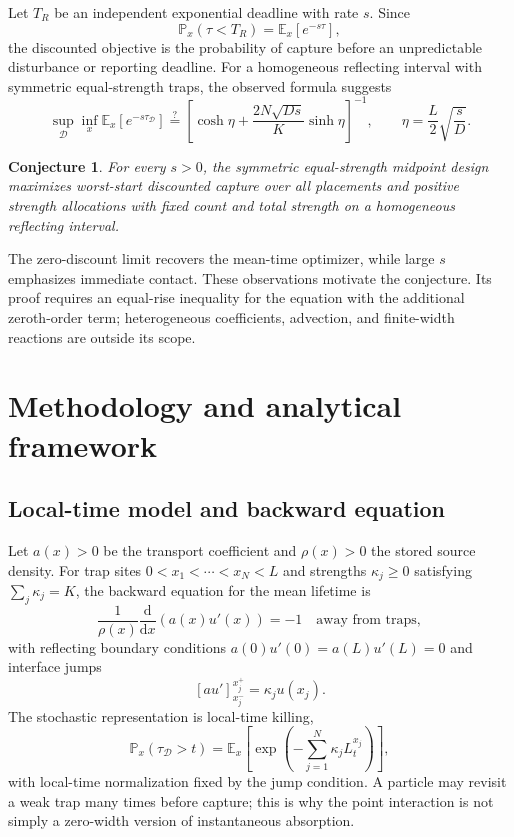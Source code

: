 \documentclass[10pt]{article}
\newcommand{\E}{\mathbb E}
\newcommand{\Prob}{\mathbb P}
\newtheorem{conjecture}{Conjecture}
\begin{document}
Let $T_R$ be an independent exponential deadline with rate $s$. Since
\[
\Prob_x(\tau<T_R)=\E_x[e^{-s\tau}],
\]
the discounted objective is the probability of capture before an unpredictable disturbance or reporting deadline. For a homogeneous reflecting interval with symmetric equal-strength traps, the observed formula suggests
\[
\sup_{\mathcal D}\inf_x\E_x[e^{-s\tau_{\mathcal D}}]
\stackrel{?}{=}
\left[\cosh\eta+\frac{2N\sqrt{Ds}}{K}\sinh\eta\right]^{-1},
\qquad
\eta=\frac{L}{2}\sqrt{\frac{s}{D}}.
\]
\begin{conjecture}
For every $s>0$, the symmetric equal-strength midpoint design maximizes worst-start discounted capture over all placements and positive strength allocations with fixed count and total strength on a homogeneous reflecting interval.
\end{conjecture}

The zero-discount limit recovers the mean-time optimizer, while large $s$ emphasizes immediate contact. These observations motivate the conjecture. Its proof requires an equal-rise inequality for the equation with the additional zeroth-order term; heterogeneous coefficients, advection, and finite-width reactions are outside its scope.

\section{Methodology and analytical framework}

\subsection{Local-time model and backward equation}

Let $a(x)>0$ be the transport coefficient and $\rho(x)>0$ the stored source density. For trap sites $0<x_1<\cdots<x_N<L$ and strengths $\kappa_j\geq0$ satisfying $\sum_j\kappa_j=K$, the backward equation for the mean lifetime is
\[
\frac{1}{\rho(x)}\frac{\mathrm d}{\mathrm dx}\left(a(x)u'(x)\right)=-1
\quad\text{away from traps},
\]
with reflecting boundary conditions $a(0)u'(0)=a(L)u'(L)=0$ and interface jumps
\[
\left[a u'\right]_{x_j^-}^{x_j^+}=\kappa_j u(x_j).
\]
The stochastic representation is local-time killing,
\[
\Prob_x(\tau_{\mathcal D}>t)=
\E_x\!\left[\exp\left(-\sum_{j=1}^N\kappa_jL_t^{x_j}\right)\right],
\]
with local-time normalization fixed by the jump condition. A particle may revisit a weak trap many times before capture; this is why the point interaction is not simply a zero-width version of instantaneous absorption.
\end{document}
